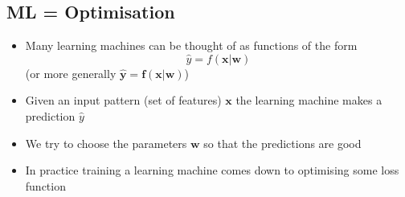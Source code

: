 \begin{slide}
\section{ML = Optimisation}

\begin{PauseHighLight}
\hypertarget{motivation}{}

\begin{itemize}
\item Many learning machines can be thought of as functions of the form
  \begin{displaymath}
    \hat{y} = f(\bm{x}|\bm{w})
  \end{displaymath}
  (or more generally $\hat{\bm{y}} = \bm{f}(\bm{x}|\bm{w})$)\pause
\item Given an input pattern (set of features) $\bm{x}$ the learning
  machine makes a prediction $\hat{y}$\pause
\item We try to choose the parameters $\bm{w}$ so that the predictions are
good\pause
\item In practice training a learning machine comes down to optimising
  some loss function\pause
\end{itemize}

\end{PauseHighLight}
\end{slide}


